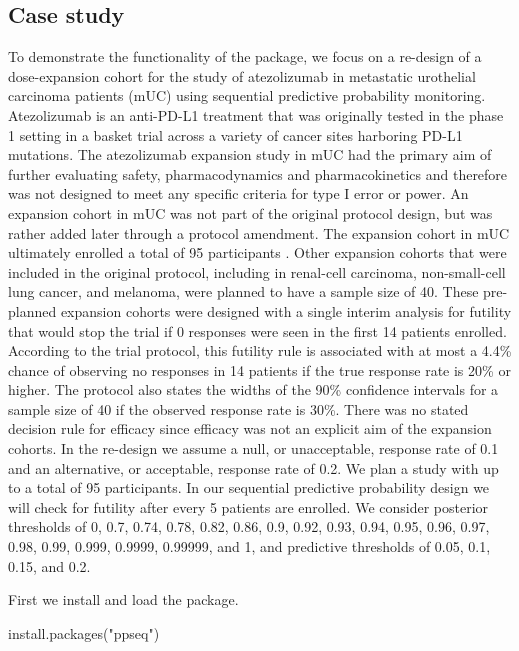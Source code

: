 \hypertarget{case-study}{%
\subsection{Case study}\label{case-study}}

To demonstrate the functionality of the  package, we focus on
a re-design of a dose-expansion cohort for the study of atezolizumab in
metastatic urothelial carcinoma patients (mUC) using sequential
predictive probability monitoring. Atezolizumab is an anti-PD-L1
treatment that was originally tested in the phase 1 setting in a basket
trial across a variety of cancer sites harboring PD-L1 mutations. The
atezolizumab expansion study in mUC had the primary aim of further
evaluating safety, pharmacodynamics and pharmacokinetics and therefore
was not designed to meet any specific criteria for type I error or
power. An expansion cohort in mUC was not part of the original protocol
design, but was rather added later through a protocol amendment. The
expansion cohort in mUC ultimately enrolled a total of 95 participants
\citep{Powles2014}. Other expansion cohorts that were included in the
original protocol, including in renal-cell carcinoma, non-small-cell
lung cancer, and melanoma, were planned to have a sample size of 40.
These pre-planned expansion cohorts were designed with a single interim
analysis for futility that would stop the trial if 0 responses were seen
in the first 14 patients enrolled. According to the trial protocol, this
futility rule is associated with at most a 4.4\% chance of observing no
responses in 14 patients if the true response rate is 20\% or higher.
The protocol also states the widths of the 90\% confidence intervals for
a sample size of 40 if the observed response rate is 30\%. There was no
stated decision rule for efficacy since efficacy was not an explicit aim
of the expansion cohorts. In the re-design we assume a null, or
unacceptable, response rate of 0.1 and an alternative, or acceptable,
response rate of 0.2. We plan a study with up to a total of 95
participants. In our sequential predictive probability design we will
check for futility after every 5 patients are enrolled. We consider
posterior thresholds of 0, 0.7, 0.74, 0.78, 0.82, 0.86, 0.9, 0.92, 0.93,
0.94, 0.95, 0.96, 0.97, 0.98, 0.99, 0.999, 0.9999, 0.99999, and 1, and
predictive thresholds of 0.05, 0.1, 0.15, and 0.2.

First we install and load the  package.

\begin{Schunk}
\begin{Sinput}
install.packages("ppseq")
\end{Sinput}
\end{Schunk}


